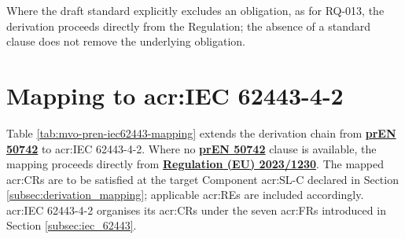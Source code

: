 Where the draft standard explicitly excludes an obligation, as for RQ-013, the derivation proceeds directly from the Regulation; the absence of a standard clause does not remove the underlying obligation.


\section{Mapping to \gls{acr:IEC} 62443-4-2}
\label{app:sec:mapping_iec62443}
\normalsize
Table \ref{tab:mvo-pren-iec62443-mapping} extends the derivation chain from \hyperref[subsec:pren_50742]{\textbf{prEN 50742}} to \gls{acr:IEC} 62443-4-2. Where no \hyperref[subsec:pren_50742]{\textbf{prEN 50742}} clause is available, the mapping proceeds directly from \hyperref[subsec:eu_machinery_regulation]{\textbf{Regulation (EU) 2023/1230}}. The mapped \glspl{acr:CR} are to be satisfied at the target Component \gls{acr:SL-C} declared in Section \ref{subsec:derivation_mapping}; applicable \glspl{acr:RE} are included accordingly. \gls{acr:IEC} 62443-4-2 organises its \glspl{acr:CR} under the seven \glspl{acr:FR} introduced in Section \ref{subsec:iec_62443}.

